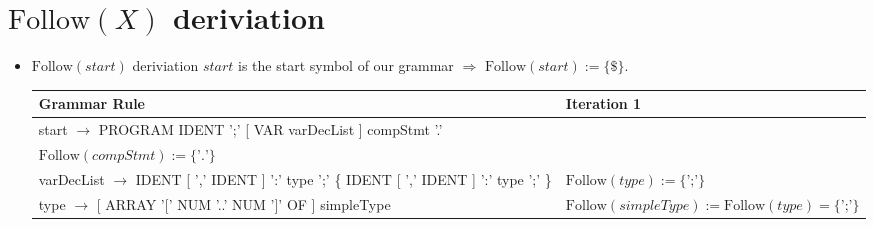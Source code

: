 \documentclass[8pt]{scrartcl}
\newcommand{\First}[1]{\mathrm{First}(#1)}
\newcommand{\Follow}[1]{\mathrm{Follow}(#1)}
\newcommand{\epsset}{\{\varepsilon\}}
\begin{document}
    \section{$\Follow{X}$ \textbf{deriviation}}
        \begin{itemize}
            \item $\Follow{start}$ deriviation\newline
                $start$ is the start symbol of our grammar $\Rightarrow$ $\Follow{start} := \{\$\}$.\newline
                \begin{tabular}{|l|l|}
                \hline
                \textbf{Grammar Rule} & \textbf{Iteration 1}\\
                \hline
                start $\rightarrow$ PROGRAM IDENT ';' [ VAR varDecList ] compStmt '.' & \makecell[l]{$\Follow{varDecList} := \First{compStmt} \setminus \epsset = \{BEGIN\}$\\
                                                                                 $\Follow{compStmt} := \{\text{'.'}\}$
                                                                                }\\
                \hline
                varDecList $\rightarrow$ IDENT [ ',' IDENT ] ':' type ';' \{ IDENT [ ',' IDENT ] ':' type ';' \} & $\Follow{type} := \{\text{';'}\}$\\
                \hline
                type $\rightarrow$ [ ARRAY '$[$' NUM '..' NUM '$]$' OF ] simpleType & $\Follow{simpleType} := \Follow{type} = \{\text{';'\}}$\\
                \hline
                \end{tabular}
        \end{itemize}
\end{document}
